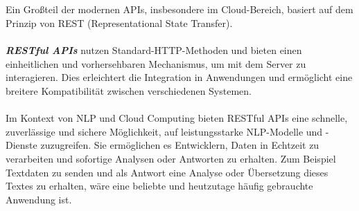 \documentclass[12pt,a4paper]{article}
\begin{document}
\ \\ \\
\ \\ \\
Ein Großteil der modernen APIs, insbesondere im Cloud-Bereich, basiert auf dem Prinzip von REST (Representational State Transfer).\\ \\
\textit{\textbf{RESTful APIs}} nutzen Standard-HTTP-Methoden und bieten einen einheitlichen und vorhersehbaren Mechanismus, um mit dem Server zu interagieren. Dies erleichtert die Integration in Anwendungen und ermöglicht eine breitere Kompatibilität zwischen verschiedenen Systemen.
\\ \\
Im Kontext von NLP und Cloud Computing bieten RESTful APIs eine schnelle, zuverlässige und sichere Möglichkeit, auf leistungsstarke NLP-Modelle und -Dienste zuzugreifen. Sie ermöglichen es Entwicklern, Daten in Echtzeit zu verarbeiten und sofortige Analysen oder Antworten zu erhalten.
Zum Beispiel Textdaten zu senden und als Antwort eine Analyse oder Übersetzung dieses Textes zu erhalten, wäre eine beliebte und heutzutage häufig gebrauchte Anwendung ist. \\
\begin{center}
\end{center}
\end{document}
